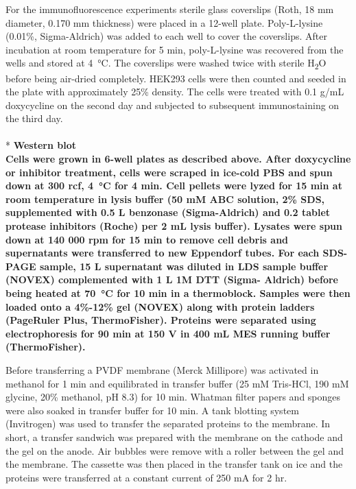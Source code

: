 For the immunofluorescence experiments sterile glass coverslips (Roth, 18 mm diameter, 0.170 mm thickness) were placed in a 12-well plate. Poly-L-lysine (0.01\%, Sigma-Aldrich) was added to each well to cover the coverslips. After incubation at room temperature for 5 min, poly-L-lysine was recovered from the wells and stored at \SI{4}{\celsius}. The coverslips were washed twice with sterile H\textsubscript{2}O before being air-dried completely. HEK293 cells were then counted and seeded in the plate with approximately 25\% density. The cells were treated with 0.1 {}\textmu g/mL doxycycline on the second day and subjected to subsequent immunostaining on the third day.
\\
\\*
\bfseries{Western blot}\\
\normalfont Cells were grown in 6-well plates as described above. After doxycycline or inhibitor treatment, cells were scraped in ice-cold PBS and spun down at 300 rcf, \SI{4}{\celsius} for 4 min. Cell pellets were lyzed for 15 min at room temperature in lysis buffer (50 mM ABC solution, 2\% SDS, supplemented with 0.5 {}\textmu L benzonase (Sigma-Aldrich) and 0.2 tablet protease inhibitors (Roche) per 2 mL lysis buffer). Lysates were spun down at 140 000 rpm for 15 min to remove cell debris and supernatants were transferred to new Eppendorf tubes. For each SDS-PAGE sample, 15 {}\textmu L supernatant was diluted in LDS sample buffer (NOVEX) complemented with 1 {}\textmu L 1M DTT (Sigma- Aldrich) before being heated at \SI{70}{\celsius} for 10 min in a thermoblock. Samples were then loaded onto a 4\%-12\% gel (NOVEX) along with protein ladders (PageRuler Plus, ThermoFisher). Proteins were separated using electrophoresis for 90 min at 150 V in 400 mL MES running buffer (ThermoFisher). 

Before transferring a PVDF membrane (Merck Millipore) was activated in methanol for 1 min and equilibrated in transfer buffer (25 mM Tris-HCl, 190 mM glycine, 20\% methanol, pH 8.3) for 10 min. Whatman filter papers and sponges were also soaked in transfer buffer for 10 min. A tank blotting system (Invitrogen) was used to transfer the separated proteins to the membrane. In short, a transfer sandwich was prepared with the membrane on the cathode and the gel on the anode. Air bubbles were remove with a roller between the gel and the membrane. The cassette was then placed in the transfer tank on ice and the proteins were transferred at a constant current of 250 mA for 2 hr.

